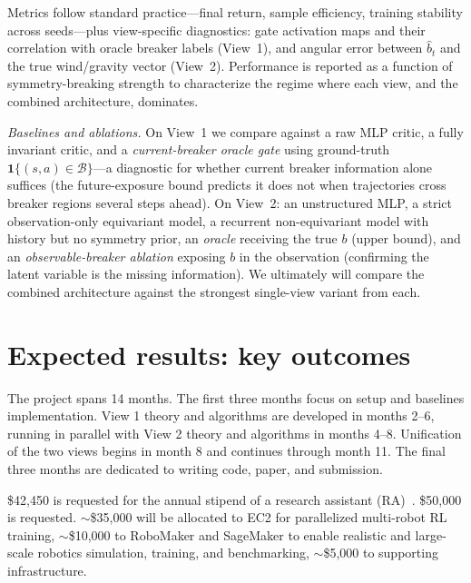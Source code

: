 \documentclass[11pt]{article}
\begin{document}
Metrics follow standard practice—final return, sample efficiency, training stability across seeds—plus view-specific diagnostics: gate activation maps and their correlation with oracle breaker labels (View~1), and angular error between $\widehat{b}_t$ and the true wind/gravity vector (View~2). Performance is reported as a function of symmetry-breaking strength to characterize the regime where each view, and the combined architecture, dominates.

\textit{Baselines and ablations.} On View~1 we compare against a raw MLP critic, a fully invariant critic, and a \emph{current-breaker oracle gate} using ground-truth $\mathbf{1}\{(s,a) \in \mathcal{B}\}$—a diagnostic for whether current breaker information alone suffices (the future-exposure bound predicts it does not when trajectories cross breaker regions several steps ahead). On View~2: an unstructured MLP, a strict observation-only equivariant model, a recurrent non-equivariant model with history but no symmetry prior, an \emph{oracle} receiving the true $b$ (upper bound), and an \emph{observable-breaker ablation} exposing $b$ in the observation (confirming the latent variable is the missing information). We ultimately will compare the combined architecture against the strongest single-view variant from each.


\section{Expected results: key outcomes}
The project spans 14 months. The first three months focus on setup and baselines implementation. View 1 theory and algorithms are developed in months 2–6, running in parallel with View 2 theory and algorithms in months 4–8. Unification of the two views begins in month 8 and continues through month 11. The final three months are dedicated to writing code, paper, and submission.

 \$42,450 is requested for the annual stipend of a research assistant (RA)~\citep{wpi_stipend_rates}.
\$50,000 is requested.
$\sim$\$35,000 will be allocated to EC2 for parallelized multi-robot RL training,
$\sim$\$10,000 to RoboMaker and SageMaker to enable realistic and large-scale robotics simulation, training, and benchmarking,
$\sim$\$5,000 to supporting infrastructure.




\end{document}
